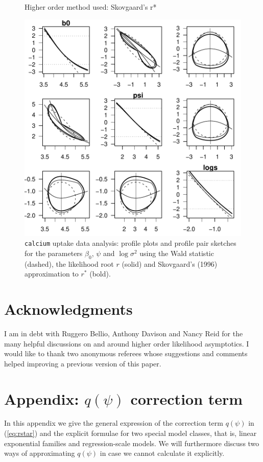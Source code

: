 \documentclass[a4paper,11pt]{article}
\def\code{\texttt}
\begin{document}
\begin{figure}[tp]
\begin{Schunk}
\begin{Soutput}
Higher order method used: Skovgaard's r*
\end{Soutput}
\end{Schunk}
\includegraphics{Rnews-paper-015}
\caption{
\code{calcium} uptake data analysis: profile plots and profile pair sketches for the parameters $\beta_0$, $\psi$ and $\log\sigma^2$ using the Wald statistic (dashed), the likelihood root $r$ (solid) and Skovgaard's (1996) approximation to $r^*$ (bold).}
\label{fig:contour.calcium}
\end{figure}


\section*{Acknowledgments}
%
I am in debt with Ruggero Bellio, Anthony Davison and Nancy Reid for the many helpful discussions on and around higher order likelihood asymptotics.  I would like to thank two anonymous referees whose suggestions and comments helped improving a previous version of this paper.  


\appendix


\section*{Appendix: $q(\psi)$ correction term}
%  
In this appendix we give the general expression of the correction term $q(\psi)$ in (\ref{eq:rstar}) and the explicit formulae for two special model classes, that is, linear exponential families and regression-scale models.  We will furthermore discuss two ways of approximating $q(\psi)$ in case we cannot calculate it explicitly. 
\end{document}
